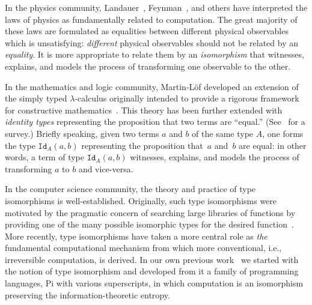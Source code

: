 \documentclass[preprint]{sigplanconf}
\begin{document}
In the physics community, Landauer~\cite{Landauer:1961,Landauer},
Feynman~\cite{springerlink:10.1007/BF02650179}, and others have interpreted
the laws of physics as fundamentally related to computation. The great
majority of these laws are formulated as equalities between different
physical observables which is unsatisfying: \emph{different} physical
observables should not be related by an \emph{equality}. It is more
appropriate to relate them by an \emph{isomorphism} that witnesses, explains,
and models the process of transforming one observable to the other.

In the mathematics and logic community, Martin-L\"of developed an extension
of the simply typed $\lambda$-calculus originally intended to provide a
rigorous framework for constructive
mathematics~\cite{citeulike:7374951}. This theory has been further extended
with \emph{identity types} representing the proposition that two terms are
``equal.'' (See~\cite{streicher,warren} for a survey.) Briefly speaking,
given two terms $a$ and $b$ of the same type $A$, one forms the type
$\texttt{Id}_A(a,b)$ representing the proposition that~$a$ and~$b$ are equal:
in other words, a term of type $\texttt{Id}_A(a,b)$ witnesses, explains, and
models the process of transforming $a$ to $b$ and vice-versa.



In the computer science community, the theory and practice of type
isomorphisms is well-established. Originally, such type isomorphisms were
motivated by the pragmatic concern of searching large libraries of functions
by providing one of the many possible isomorphic types for the desired
function~\cite{Rittri:1989:UTS:99370.99384}. More recently, type isomorphisms
have taken a more central role as \emph{the} fundamental computational
mechanism from which more conventional, i.e., irreversible computation, is
derived. In our own previous
work~\cite{James:2012:IE:2103656.2103667,rc2011,rc2012} we started with the
notion of type isomorphism and developed from it a family of programming
languages, {{Pi}} with various superscripts, in which computation is an
isomorphism preserving the information-theoretic entropy.
\end{document}
